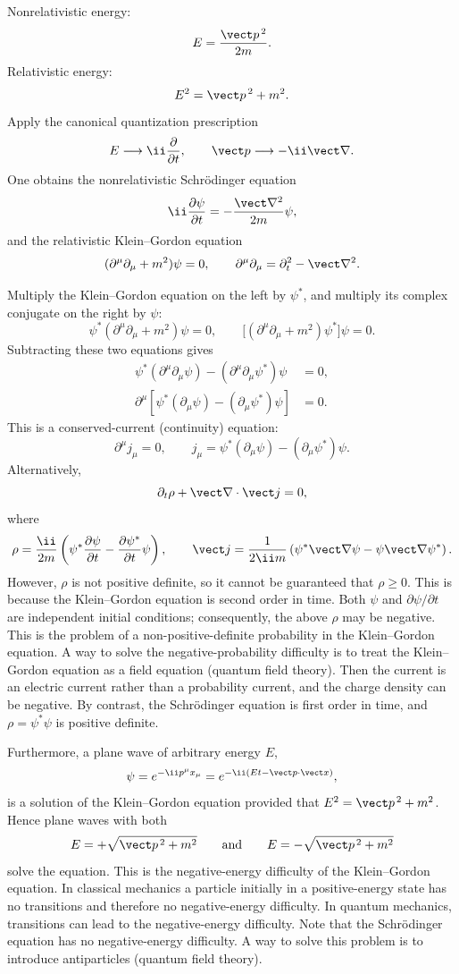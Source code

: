 Nonrelativistic energy:
\[
E=\frac{\vect p^{\,2}}{2m}.
\]
Relativistic energy:
\[
E^2=\vect p^{\,2}+m^2.
\]
Apply the canonical quantization prescription
\[
E\longrightarrow\ii\frac{\partial}{\partial t},\qquad
\vect p\longrightarrow-\ii\vect\nabla.
\]
One obtains the nonrelativistic Schr\"odinger equation
\[
\ii\frac{\partial\psi}{\partial t}=-\frac{\vect\nabla^{2}}{2m}\psi,
\]
and the relativistic Klein--Gordon equation
\[
(\partial^\mu\partial_\mu+m^2)\psi=0,\qquad
\partial^\mu\partial_\mu=\partial_t^2-\vect\nabla^2.
\]

Multiply the Klein--Gordon equation on the left by $\psi^*$, and multiply its complex conjugate on the right by $\psi$:
\[
\psi^*(\partial^\mu\partial_\mu+m^2)\psi=0,\qquad
\bigl[(\partial^\mu\partial_\mu+m^2)\psi^*\bigr]\psi=0.
\]
Subtracting these two equations gives
\begin{align*}
\psi^*(\partial^\mu\partial_\mu\psi)-(\partial^\mu\partial_\mu\psi^*)\psi&=0,\\
\partial^\mu\left[\psi^*(\partial_\mu\psi)-(\partial_\mu\psi^*)\psi\right]&=0.
\end{align*}
This is a conserved-current (continuity) equation:
\[
\partial^\mu j_\mu=0,\qquad
j_\mu=\psi^*(\partial_\mu\psi)-(\partial_\mu\psi^*)\psi.
\]
Alternatively,
\[
\partial_t\rho+\vect\nabla\cdot\vect j=0,
\]
where
\[
\rho=\frac{\ii}{2m}\left(\psi^*\frac{\partial\psi}{\partial t}-
\frac{\partial\psi^*}{\partial t}\psi\right),\qquad
\vect j=\frac{1}{2\ii m}
\left(\psi^*\vect\nabla\psi-\psi\vect\nabla\psi^*\right).
\]
However, $\rho$ is not positive definite, so it cannot be guaranteed that $\rho\geq0$. This is because the Klein--Gordon equation is second order in time. Both $\psi$ and $\partial\psi/\partial t$ are independent initial conditions; consequently, the above $\rho$ may be negative. This is the problem of a non-positive-definite probability in the Klein--Gordon equation. A way to solve the negative-probability difficulty is to treat the Klein--Gordon equation as a field equation (quantum field theory). Then the current is an electric current rather than a probability current, and the charge density can be negative. By contrast, the Schr\"odinger equation is first order in time, and $\rho=\psi^*\psi$ is positive definite.

Furthermore, a plane wave of arbitrary energy $E$,
\[
\psi=e^{-\ii p^\mu x_\mu}=e^{-\ii(Et-\vect p\cdot\vect x)},
\]
is a solution of the Klein--Gordon equation provided that $E^2=\vect p^{\,2}+m^2$. Hence plane waves with both
\[
E=+\sqrt{\vect p^{\,2}+m^2}\qquad\text{and}\qquad
E=-\sqrt{\vect p^{\,2}+m^2}
\]
solve the equation. This is the negative-energy difficulty of the Klein--Gordon equation. In classical mechanics a particle initially in a positive-energy state has no transitions and therefore no negative-energy difficulty. In quantum mechanics, transitions can lead to the negative-energy difficulty. Note that the Schr\"odinger equation has no negative-energy difficulty. A way to solve this problem is to introduce antiparticles (quantum field theory).

